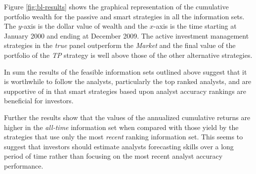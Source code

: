 \documentclass{article}\usepackage[]{graphicx}\usepackage[]{color}
\newcommand{\tr}{\textit{true}}
\newcommand{\naive}{\textit{recent}}
\newcommand{\default}{\textit{all-time}}
\newcommand{\same}{\textit{same}}
\newcommand{\all}{\textit{all}}
\begin{document}
{%



Figure \ref{fig:bl-results} shows the graphical representation of the cumulative portfolio wealth for  the passive and smart strategies in all the information sets. The $y$-axis is the dollar value of wealth and the $x$-axis is the time starting at January 2000 and ending at December  2009. The active investment management strategies in the \tr{} panel outperform the \emph{Market} and the final value  of the portfolio of the \textit{TP} strategy is well above those of the other alternative strategies.


In sum the results of the feasible information sets outlined above suggest that  it is worthwhile to follow the analysts, particularly the top ranked analysts, and are supportive of \cite{desai2000ass} in that smart strategies based upon analyst accuracy rankings are beneficial for investors.

Further the results show that the values of the annualized cumulative returns are higher in the \default{} information set when compared with those yield by the strategies that use only the most \naive{} ranking information set. This seems to suggest that investors should estimate analysts forecasting skills over a long period of time rather than focusing on the most recent analyst accuracy performance.







}
\end{document}
